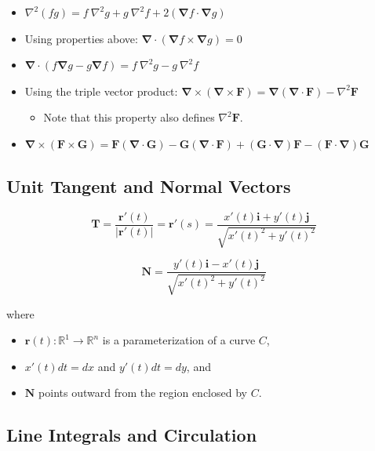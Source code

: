 \begin{itemize}
    \item $\nabla^2(fg) = f~\nabla^2 g + g~\nabla^2 f + 2(\bm{\nabla}f \cdot \bm{\nabla}g)$
    \item Using properties above: $\bm{\nabla} \cdot (\bm{\nabla} f \times \bm{\nabla} g) = 0$
    \item $\bm{\nabla} \cdot (f \bm{\nabla} g - g \bm{\nabla} f) = f~\nabla^2 g - g~\nabla^2 f$
    \item Using the triple vector product: $\bm{\nabla} \times (\bm{\nabla} \times \mathbf{F}) = \bm{\nabla}(\bm{\nabla} \cdot \mathbf{F}) - \nabla^2 \mathbf{F}$
          \begin{itemize}
              \item Note that this property also defines $\nabla^2 \mathbf{F}$.
          \end{itemize}
    \item $\bm{\nabla} \times (\mathbf{F} \times \mathbf{G}) = \mathbf{F}(\bm{\nabla} \cdot \mathbf{G}) - \mathbf{G}(\bm{\nabla} \cdot \mathbf{F}) + (\mathbf{G} \cdot \bm{\nabla})\mathbf{F} - (\mathbf{F} \cdot \bm{\nabla})\mathbf{G}$
\end{itemize}

\subsection{Unit Tangent and Normal Vectors}

\begin{equation*}
    \mathbf{T} = \frac{\mathbf{r}'(t)}{|\mathbf{r}'(t)|} = \mathbf{r}'(s) = \frac{x'(t)\mathbf{i} + y'(t)\mathbf{j}}{\sqrt{x'(t)^2 + y'(t)^2}}
\end{equation*}

\begin{equation*}
    \mathbf{N} = \frac{y'(t)\mathbf{i} - x'(t)\mathbf{j}}{\sqrt{x'(t)^2 + y'(t)^2}}
\end{equation*}

where
\begin{itemize}
    \item $\mathbf{r}(t): \mathbb{R}^1 \to \mathbb{R}^n$ is a parameterization of a curve $C$,
    \item $x'(t)dt = dx$ and $y'(t)dt = dy$, and
    \item $\mathbf{N}$ points outward from the region enclosed by $C$.
\end{itemize}

\subsection{Line Integrals and Circulation}

